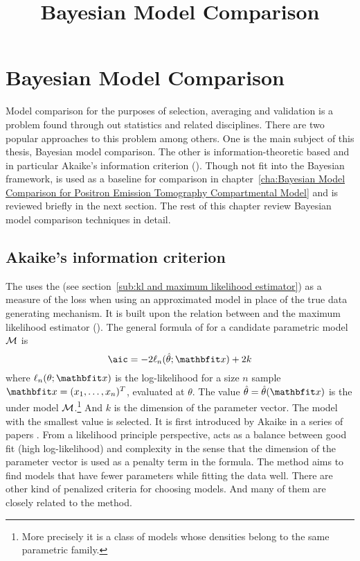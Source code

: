 \ifx\inthesis\undefined %

\title{Bayesian Model Comparison}

\maketitle
\else %
\chapter{Bayesian Model Comparison}
\label{cha:Bayesian Model Comparison}
\fi %

Model comparison for the purposes of selection, averaging and validation is a
problem found through out statistics and related disciplines. There are two
popular approaches to this problem among others. One is the main subject of
this thesis, Bayesian model comparison. The other is information-theoretic
based and in particular Akaike's information criterion (\aic). Though not fit
into the Bayesian framework, \aic is used as a baseline for comparison in
chapter~\ref{cha:Bayesian Model Comparison for Positron Emission Tomography
  Compartmental Model} and is reviewed briefly in the next section. The rest
of this chapter review Bayesian model comparison techniques in detail.

\section{Akaike's information criterion}
\label{sec:Akaike's information criterion}

The \aic uses the \kl (see section~\ref{sub:kl and maximum likelihood
  estimator}) as a measure of the loss when using an approximated model in
place of the true data generating mechanism. It is built upon the relation
between \kl and the maximum likelihood estimator (\mle). The general formula
of \aic for a candidate parametric model $\mathcal{M}$ is
\begin{equation}
  \text{\aic} = -2\ell_n(\hat\theta;\bfx) + 2k
\end{equation}
where $\ell_n(\theta;\bfx)$ is the log-likelihood for a size $n$ sample
$\bfx=(x_1,\dots,x_n)^T$, evaluated at $\theta$. The value $\hat\theta = \hat\theta(\bfx)$
is the \mle under model $\mathcal{M}$.\footnote{More precisely it is a class of
  models whose densities belong to the same parametric family.} And $k$ is the
dimension of the parameter vector. The model with the smallest \aic value is
selected. It is first introduced by Akaike in a series of papers
\parencite{Akaike:1973uc, Akaike:1974ih, Akaike:1977ul}. From a likelihood
principle perspective, \aic acts as a balance between good fit (high
log-likelihood) and complexity in the sense that the dimension of the
parameter vector is used as a penalty term in the formula.  The \aic method
aims to find models that have fewer parameters while fitting the data well.
There are other kind of penalized criteria for choosing models.  And many of
them are closely related to the \aic method.

